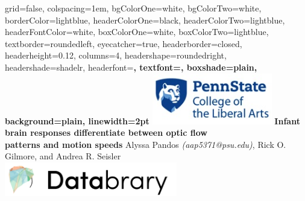 \documentclass[landscape,final,paperwidth=48in,paperheight=33in,fontscale=0.285]{baposter}
\begin{document}



\begin{poster}%
  {
  grid=false,
  colspacing=1em,
  bgColorOne=white,
  bgColorTwo=white,
  borderColor=lightblue,
  headerColorOne=black,
  headerColorTwo=lightblue,
  headerFontColor=white,
  boxColorOne=white,
  boxColorTwo=lightblue,
  textborder=roundedleft,
  eyecatcher=true,
  headerborder=closed,
  headerheight=0.12\textheight,
  columns=4, %
  headershape=roundedright,
  headershade=shadelr,
  headerfont=\Large\bf\textsc, %
  textfont={\setlength{\parindent}{1.5em}},
  boxshade=plain,
  background=plain,
  linewidth=2pt
  }
  {\includegraphics[height=6em]{penn_state_cla_logo_new_210-89.jpg}}
  {\vspace{0.1em}
  \bf{Infant brain responses differentiate between optic flow\\ patterns and motion speeds} 
  \vspace{0.3em}}
  {Alyssa Pandos \emph{(aap5371@psu.edu)}, Rick O. Gilmore, and Andrea R. Seisler\\ \vspace{0.3em}
  }
 {\includegraphics[height=4em]{databrary.png}}


\end{poster}
\end{document}
